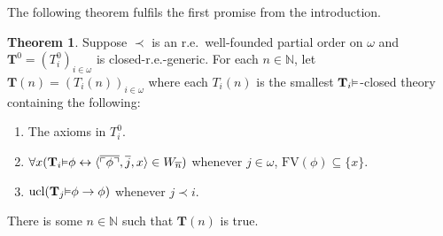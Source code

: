 \documentclass[reqno]{article}
\theoremstyle{definition}
\newtheorem{theorem}{Theorem}
\def\N{\mathbb{N}}
\def\T{\mathbf{T}}
\def\FV{\mathrm{FV}}
\renewcommand{\Pr}[1]{\T_{#1}\mbox{\small${\vDash}$}}
\newcommand{\ucl}[1]{\mathrm{ucl}(#1)}
\begin{document}
The following theorem fulfils the first promise from the introduction.


\begin{theorem}
\label{onethreethree}
Suppose $\prec$ is an r.e.~well-founded
partial order on $\omega$
and $\T^0=(T^0_i)_{i\in \omega}$ is closed-r.e.-generic.
For each $n\in\N$,
let $\T(n)=(T_i(n))_{i\in \omega}$
where each $T_i(n)$ is the smallest $\Pr i$-closed theory
containing the following:
\begin{enumerate}
\item The axioms in $T^0_i$.
\item $\forall x(\Pr i\phi\leftrightarrow\langle\overline{\ulcorner\phi\urcorner},\overline j,x\rangle\in W_{\overline n})$
whenever $j\in\omega$, 
$\FV(\phi)\subseteq\{x\}$.
\item $\ucl{\Pr j\phi\rightarrow\phi}$ whenever $j\prec i$.
\end{enumerate}
There is some $n\in\N$ such that $\T(n)$ is true.
\end{theorem}
\end{document}
